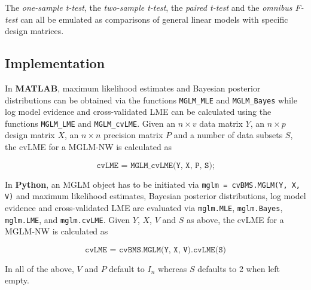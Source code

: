 The \textit{one-sample t-test}, the \textit{two-sample t-test}, the \textit{paired t-test} and the \textit{omnibus F-test} can all be emulated as comparisons of general linear models with specific design matrices.


\pagebreak
\subsection{Implementation} \label{sec:MGLM-Imp}

In \textbf{MATLAB}, maximum likelihood estimates and Bayesian posterior distributions can be obtained via the functions \verb|MGLM_MLE| and \verb|MGLM_Bayes| while log model evidence and cross-validated LME can be calculated using the functions \verb|MGLM_LME| and \verb|MGLM_cvLME|. Given an $n \times v$ data matrix $Y$, an $n \times p$ design matrix $X$, an $n \times n$ precision matrix $P$ and a number of data subsets $S$, the cvLME for a MGLM-NW is calculated as

\begin{equation} \label{eq:MGLM-NW-cvLME-MATLAB}
\texttt{cvLME = MGLM\_cvLME(Y, X, P, S);}
\end{equation}

In \textbf{Python}, an MGLM object has to be initiated via \verb|mglm = cvBMS.MGLM(Y, X, V)| and maximum likelihood estimates, Bayesian posterior distributions, log model evidence and cross-validated LME are evaluated via \verb|mglm.MLE|, \verb|mglm.Bayes|, \verb|mglm.LME|, and \verb|mglm.cvLME|. Given $Y$, $X$, $V$ and $S$ as above, the cvLME for a MGLM-NW is calculated as

\begin{equation} \label{eq:MGLM-NW-cvLME-Python}
\texttt{cvLME = cvBMS.MGLM(Y, X, V).cvLME(S)}
\end{equation}

In all of the above, $V$ and $P$ default to $I_n$ whereas $S$ defaults to 2 when left empty.